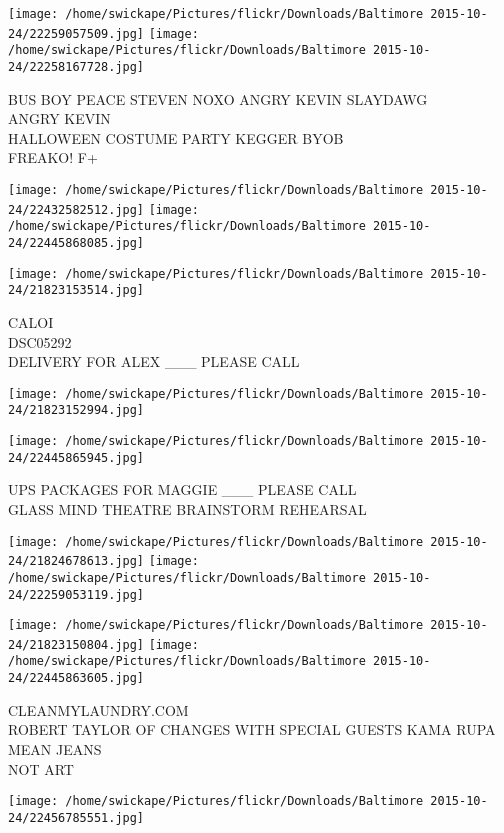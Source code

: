 \documentclass[10pt,letterpaper]{article}
\begin{document}
\texttt{[image: /home/swickape/Pictures/flickr/Downloads/Baltimore 2015-10-24/22259057509.jpg]}
\texttt{[image: /home/swickape/Pictures/flickr/Downloads/Baltimore 2015-10-24/22258167728.jpg]}

BUS BOY PEACE STEVEN NOXO ANGRY KEVIN SLAYDAWG\\
ANGRY KEVIN\\
HALLOWEEN COSTUME PARTY KEGGER BYOB\\
FREAKO!  F+
\pagebreak

\texttt{[image: /home/swickape/Pictures/flickr/Downloads/Baltimore 2015-10-24/22432582512.jpg]}
\texttt{[image: /home/swickape/Pictures/flickr/Downloads/Baltimore 2015-10-24/22445868085.jpg]}

\vspace{0.25in}
\texttt{[image: /home/swickape/Pictures/flickr/Downloads/Baltimore 2015-10-24/21823153514.jpg]}

CALOI\\
DSC05292\\
DELIVERY FOR ALEX \_\_\_ PLEASE CALL
\pagebreak

\texttt{[image: /home/swickape/Pictures/flickr/Downloads/Baltimore 2015-10-24/21823152994.jpg]}

\vspace{0.25in}
\texttt{[image: /home/swickape/Pictures/flickr/Downloads/Baltimore 2015-10-24/22445865945.jpg]}

UPS PACKAGES FOR MAGGIE \_\_\_ PLEASE CALL\\
GLASS MIND THEATRE BRAINSTORM REHEARSAL
\pagebreak

\texttt{[image: /home/swickape/Pictures/flickr/Downloads/Baltimore 2015-10-24/21824678613.jpg]}
\texttt{[image: /home/swickape/Pictures/flickr/Downloads/Baltimore 2015-10-24/22259053119.jpg]}

\texttt{[image: /home/swickape/Pictures/flickr/Downloads/Baltimore 2015-10-24/21823150804.jpg]}
\texttt{[image: /home/swickape/Pictures/flickr/Downloads/Baltimore 2015-10-24/22445863605.jpg]}

CLEANMYLAUNDRY.COM\\
ROBERT TAYLOR OF CHANGES WITH SPECIAL GUESTS KAMA RUPA\\
MEAN JEANS\\
NOT ART
\pagebreak

\texttt{[image: /home/swickape/Pictures/flickr/Downloads/Baltimore 2015-10-24/22456785551.jpg]}
\end{document}
